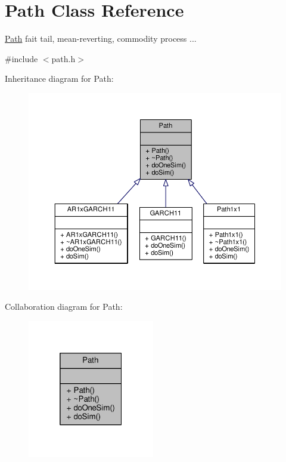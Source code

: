 \hypertarget{classPath}{}\section{Path Class Reference}
\label{classPath}


\hyperlink{classPath}{Path} fait tail, mean-\/reverting, commodity process ...  




{\ttfamily \#include $<$path.\+h$>$}



Inheritance diagram for Path\+:
\nopagebreak
\begin{figure}[H]
\begin{center}
\leavevmode
\includegraphics[width=350pt]{classPath__inherit__graph}
\end{center}
\end{figure}


Collaboration diagram for Path\+:
\nopagebreak
\begin{figure}[H]
\begin{center}
\leavevmode
\includegraphics[width=157pt]{classPath__coll__graph}
\end{center}
\end{figure}
